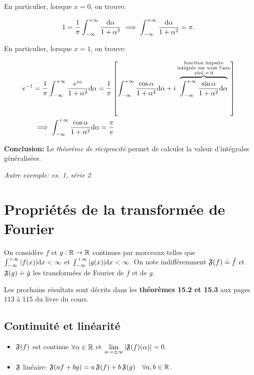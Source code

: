 \begin{example}
    En particulier, lorsque $x = 0$, on trouve:
    
   \[1 = \frac{1}{\pi} \int_{-\infty}^{+\infty} \frac{\mathrm{d}\alpha}{1 + \alpha^2} \implies \int_{-\infty}^{+\infty} \frac{\mathrm{d}\alpha}{1 + \alpha^2} = \pi.
   \]
    
    En particulier, lorsque $x = 1$, on trouve:
    
    \begin{align*}
    e^{-1} &=
    \frac{1}{\pi} \int_{-\infty}^{+\infty} \frac{e^{i \alpha}}{1 + \alpha^2}\mathrm{d}\alpha =
    \frac{1}{\pi} \left[ \int_{-\infty}^{+\infty} \frac{\cos \alpha}{1 + \alpha^2} \mathrm{d}\alpha +
    i \overbrace{\int_{-\infty}^{+\infty} \frac{\sin \alpha}{1 + \alpha^2} \mathrm{d}\alpha}^{\substack{\textrm{fonction impaire} \\ \textrm{intégrée sur tout l'axe} \\ \textrm{réel } = \> 0}} \right]
    \\&\implies
    \int_{-\infty}^{+\infty} \frac{\cos \alpha}{1 + \alpha^2} \mathrm{d}\alpha = \frac{\pi}{e}
    \end{align*}

\end{example}

\textbf{Conclusion:} Le \textit{théorème de réciprocité} permet de calculer la valeur d'intégrales généralisées.

\textit{Autre exemple: ex. 1, série 2}



\section{Propriétés de la transformée de Fourier}


On considère $f$ et $g: \mathbb{R} \rightarrow \mathbb{R}$ continues par morceaux telles que $\int_{-\infty}^{+\infty} |f(x)| \mathrm{d}x < \infty$ et $\int_{-\infty}^{+\infty} |g(x)| \mathrm{d}x < \infty$.
On note indifféremment $\mathfrak{F}(f) \doteq \hat{f}$ et $\mathfrak{F}(g) \doteq \hat{g}$ les transformées de Fourier de $f$ et de $g$.

\begin{note}
    Les prochains résultats sont décrits dans les \textbf{théorèmes 15.2 et 15.3} aux pages 113 à 115 du livre du cours.
\end{note}


\subsection{Continuité et linéarité}

\begin{itemize}
\item
$\mathfrak{F}(f)$ est continue $\forall \alpha \in \mathbb{R}$ et $\lim\limits_{\alpha \rightarrow \pm \infty} |\mathfrak{F}(f)(\alpha)| = 0$.
\item
$\mathfrak{F}$ linéaire: $\mathfrak{F}(af + bg) = a\,\mathfrak{F}(f) + b\,\mathfrak{F}(g) \quad \forall a,b \in \mathbb{R}$.
\end{itemize}


